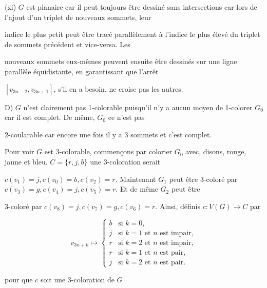 \documentclass{article}
\begin{document}
(xi) $G$ est planaire car il peut toujours être dessiné sans intersections car lors de l'ajout d'un triplet de nouveaux sommets, leur 

indice le plus petit peut être tracé parallèlement à l'indice le plus élevé du triplet de sommets précédent et vice-versa. Les 

nouveaux sommets eux-mêmes peuvent ensuite être dessinés sur une ligne parallèle équidistante, en garantissant que l'arrêt 

$[ v_{3n-2},v_{3n+1} ]$, s'il en a besoin, ne croise pas les autres.
\vspace{0.2cm}

D) $G$ n'est clairement pas 1-colorable puisqu'il n'y a aucun moyen de 1-colorer $G_0$ car il est complet. De même, $G_0$ ce n'est pas 

2-coularable car encore une fois il y a 3 sommets et c'est complet.

Pour voir $G$ est 3-colorable, commençons par colorier $G_0$ avec, disons, rouge, jaune et bleu. $C = \{ r,j,b \}$ une 3-coloration serait 

$c(v_1)= j, c(v_0)= b, c(v_2)= r$. Maintenant $G_1$ peut être 3-coloré par $c(v_3)= g, c(v_4)= j, c(v_5)= r$. Et de même $G_2$ peut être 

3-coloré par $c(v_8)= j, c(v_7)= g, c(v_6)= r$. Ainsi, définis $c : V(G) \rightarrow C$ par

\[
v_{3n+k} \mapsto
\begin{cases} 
b & \text{si } k = 0, \\
j & \text{si } k = 1 \text{ et } n \text{ est impair}, \\
r & \text{si } k = 2 \text{ et } n \text{ est impair}, \\
r & \text{si } k = 1 \text{ et } n \text{ est pair}, \\
j & \text{si } k = 2 \text{ et } n \text{ est pair}.
\end{cases}
\]

pour que $c$ soit une 3-coloration de $G$
\end{document}
